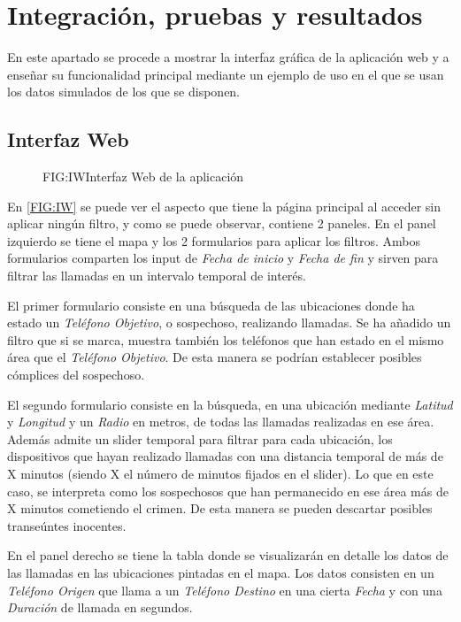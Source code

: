 \chapter{Integración, pruebas y resultados\label{CAP:IPR}}
  En este apartado se procede a mostrar la interfaz gráfica de la aplicación web y a enseñar su funcionalidad principal mediante un ejemplo de uso en el que se usan los datos simulados de los que se disponen.
  
  \section{Interfaz Web}
    
    \begin{figure}[Interfaz Web de la aplicación]{FIG:IW}{Interfaz Web de la aplicación}
    \end{figure}
    
    En \ref{FIG:IW} se puede ver el aspecto que tiene la página principal al acceder sin aplicar ningún filtro, y como se puede observar, contiene 2 paneles. 
    En el panel izquierdo se tiene el mapa y los 2 formularios para aplicar los filtros. Ambos formularios comparten los input de \textit{Fecha de inicio} y \textit{Fecha de fin} y sirven para filtrar las llamadas en un intervalo temporal de interés.
    
    El primer formulario consiste en una búsqueda de las ubicaciones donde ha estado un \textit{Teléfono Objetivo}, o sospechoso, realizando llamadas. 
    Se ha añadido un filtro que si se marca, muestra también los teléfonos que han estado en el mismo área que el \textit{Teléfono Objetivo}. De esta manera se podrían establecer posibles cómplices del sospechoso.
  
    El segundo formulario consiste en la búsqueda, en una ubicación mediante \textit{Latitud} y \textit{Longitud} y un \textit{Radio} en metros, de todas las llamadas realizadas en ese área.
    Además admite un slider temporal para filtrar para cada ubicación, los dispositivos que hayan realizado llamadas con una distancia temporal de más de X minutos (siendo X el número de minutos fijados en el slider). Lo que en este caso, se interpreta como los sospechosos que han permanecido en ese área más de X minutos cometiendo el crimen. De esta manera se pueden descartar posibles transeúntes inocentes.
    
    En el panel derecho se tiene la tabla donde se visualizarán en detalle los datos de las llamadas en las ubicaciones pintadas en el mapa. Los datos consisten en un \textit{Teléfono Origen} que llama a un \textit{Teléfono Destino} en una cierta \textit{Fecha} y con una \textit{Duración} de llamada en segundos.
    
